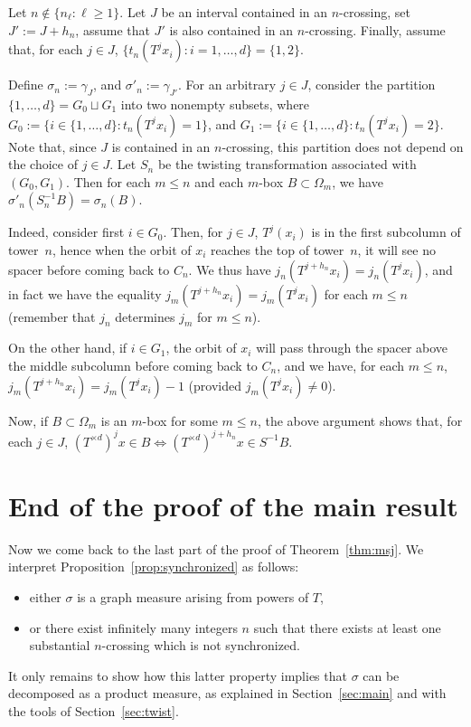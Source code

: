\documentclass[AHL,Unicode,longabstracts]{cedram}
\newcommand{\egdef}{:=}
\newcommand{\td}{T^{\times d}}
\newcommand{\ovC}{\Omega}
\begin{document}
\begin{example}\label{Ex:twist}
Let $n \notin \{n_\ell: \ell\ge1\}$. Let $J$ be an interval contained in an $n$-crossing, set $J'\egdef J+h_n$, assume that $J'$ is also contained in an $n$-crossing. Finally, assume that, for each $j\in J$, $\bigl\{ t_n(T^jx_i): i=1,\ldots,d\bigr\}=\{1,2\}$.

Define $\sigma_n\egdef \gamma_J$, and $\sigma'_n\egdef\gamma_{J'}$. For an arbitrary $j\in J$, consider the partition $\{1,\ldots,d\}=G_0\sqcup G_1$ into two nonempty subsets, where $G_0\egdef\bigl\{i\in\{1,\ldots,d\}: t_n(T^jx_i)=1\bigr\}$, and $G_1\egdef\bigl\{i\in\{1,\ldots,d\}: t_n(T^jx_i)=2\bigr\}$. Note that, since $J$ is contained in an $n$-crossing, this partition does not depend on the choice of $j\in J$. Let $S_n$ be the twisting transformation associated with $(G_0,G_1)$. Then for each $m\le n$ and each $m$-box $B\subset \ovC_m$, we have $\sigma'_n(S_n^{-1}B)=\sigma_n(B)$.

Indeed, consider first $i\in G_0$. Then, for $j\in J$, $T^j(x_i)$ is in the first subcolumn of tower~$n$, hence when the orbit of $x_i$ reaches the top of tower~$n$, it will see no spacer before coming back to $C_n$. We thus have $j_n(T^{j+h_n}x_i)=j_n(T^jx_i)$, and in fact we have the equality $j_m(T^{j+h_n}x_i)=j_m(T^jx_i)$ for each $m\le n$ (remember that $j_n$ determines $j_m$ for $m\le n$).

On the other hand, if $i\in G_1$, the orbit of $x_i$ will pass through the spacer above the middle subcolumn before coming back to $C_n$, and we have, for each $m\le n$, $j_m(T^{j+h_n}x_i)=j_m(T^jx_i)-1$ (provided $j_m(T^jx_i)\neq 0$).

Now, if $B\subset\ovC_m$ is an $m$-box for some $m\le n$, the above argument shows that, for each $j\in J$, $(\td)^jx\in B\Longleftrightarrow (\td)^{j+h_n}x\in S^{-1}B$.
\end{example}


\section{End of the proof of the main result}\label{sec:end}
Now we come back to the last part of the proof of Theorem~\ref{thm:msj}. We interpret Proposition~\ref{prop:synchronized} as follows:
\begin{itemize}
\item either $\sigma$ is a graph measure arising from powers of $T$,
\item or there exist infinitely many integers $n$ such that there exists at least one substantial $n$-crossing which is not synchronized.
\end{itemize}
It only remains to show how this latter property implies that $\sigma$ can be decomposed as a product measure, as explained in Section~\ref{sec:main} and with the tools of Section~\ref{sec:twist}.
\end{document}
